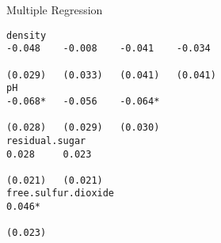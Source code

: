 \documentclass{mine}
\begin{document}
\begin{slide}{Multiple Regression}
\begin{verbatim}
density                                                                                     -0.048    -0.008    -0.041    -0.034   
                                                                                            (0.029)   (0.033)   (0.041)   (0.041)  
pH                                                                                                    -0.068*   -0.056    -0.064*  
                                                                                                      (0.028)   (0.029)   (0.030)  
residual.sugar                                                                                                   0.028     0.023   
                                                                                                                (0.021)   (0.021)  
free.sulfur.dioxide                                                                                                        0.046*  
                                                                                                                          (0.023)
\end{verbatim}

\end{slide}
\end{document}
